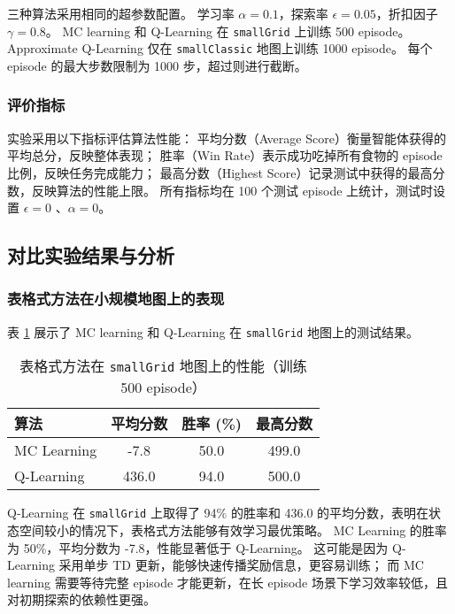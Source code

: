 三种算法采用相同的超参数配置。
学习率 $\alpha = 0.1$，探索率 $\epsilon = 0.05$，折扣因子 $\gamma = 0.8$。
MC learning 和 Q-Learning 在 \texttt{smallGrid} 上训练 500 episode。
Approximate Q-Learning 仅在 \texttt{smallClassic} 地图上训练 1000 episode。
每个 episode 的最大步数限制为 1000 步，超过则进行截断。

\subsubsection{评价指标}

实验采用以下指标评估算法性能：
平均分数（Average Score）衡量智能体获得的平均总分，反映整体表现；
胜率（Win Rate）表示成功吃掉所有食物的 episode 比例，反映任务完成能力；
最高分数（Highest Score）记录测试中获得的最高分数，反映算法的性能上限。
所有指标均在 100 个测试 episode 上统计，测试时设置 $\epsilon = 0$ 、$\alpha = 0$。


\subsection{对比实验结果与分析}

\subsubsection{表格式方法在小规模地图上的表现}

表 \ref{tab:tabular_methods} 展示了 MC learning 和 Q-Learning 在 \texttt{smallGrid} 地图上的测试结果。

\begin{table}[h]
    \renewcommand{\arraystretch}{1.5}
    \setlength{\tabcolsep}{10pt}
    \centering
    \caption{表格式方法在 \texttt{smallGrid} 地图上的性能（训练 500 episode）}
    \small
    \begin{tabular}{lccc}
        \toprule
        \textbf{算法} & \textbf{平均分数} & \textbf{胜率 (\%)} & \textbf{最高分数} \\
        \midrule
        MC Learning & -7.8 & 50.0 & 499.0 \\
        Q-Learning & 436.0 & 94.0 & 500.0 \\
        \bottomrule
    \end{tabular}
    \label{tab:tabular_methods}
\end{table}

Q-Learning 在 \texttt{smallGrid} 上取得了 94\% 的胜率和 436.0 的平均分数，表明在状态空间较小的情况下，表格式方法能够有效学习最优策略。
MC Learning 的胜率为 50\%，平均分数为 -7.8，性能显著低于 Q-Learning。
这可能是因为 Q-Learning 采用单步 TD 更新，能够快速传播奖励信息，更容易训练；
而 MC learning 需要等待完整 episode 才能更新，在长 episode 场景下学习效率较低，且对初期探索的依赖性更强。

